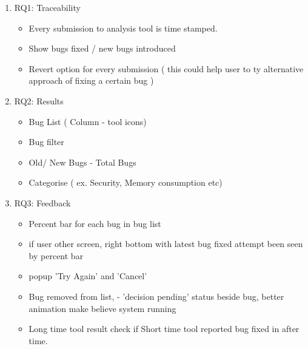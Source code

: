 \begin{enumerate}
	\item RQ1: Traceability

\begin{itemize}
	\item Every submission to analysis tool is time stamped.
	\item Show bugs fixed / new bugs introduced
	\item  Revert option for every submission ( this could help user to ty alternative approach of fixing a certain bug )
\end{itemize}

\item RQ2: Results

\begin{itemize}
	\item Bug List ( Column - tool icons)
	\item Bug filter
	\item Old/ New Bugs - Total Bugs
	\item Categorise ( ex. Security, Memory consumption etc)
\end{itemize}

\item RQ3: Feedback

\begin{itemize}
	\item Percent bar for each bug in bug list
	\item if user other screen, right bottom with latest bug fixed attempt been seen by percent bar
	\item popup 'Try Again' and 'Cancel'
	\item Bug removed from list, - 'decision pending' status beside bug, better animation make believe system running
	\item Long time tool result check if Short time tool reported bug fixed in after time.
\end{itemize}

\end{enumerate}